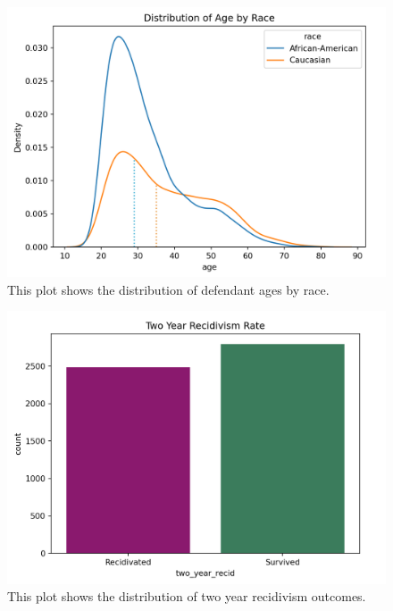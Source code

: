 \documentclass[water,article,submit,moreauthors,pdftex]{mdpi}
\begin{document}
\begin{figure}

{\centering \includegraphics[width=1\linewidth]{../images/age_race_plot_new} 

}

\caption{This plot shows the distribution of defendant ages by race.}\label{fig:age plot}
\end{figure}

\begin{figure}

{\centering \includegraphics[width=1\linewidth]{../images/recid_bar_plot_new} 

}

\caption{This plot shows the distribution of two year recidivism outcomes.}\label{fig:recid plot}
\end{figure}
\end{document}
